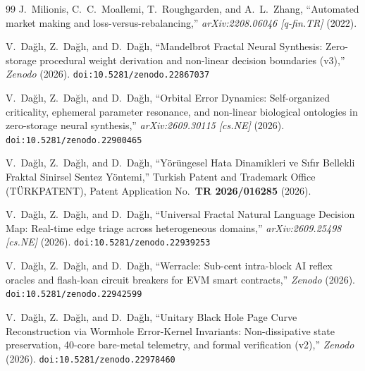 \documentclass[10pt,a4paper]{article}
\begin{document}
\begin{thebibliography}{99}
 J.~Milionis, C.~C.~Moallemi, T.~Roughgarden, and A.~L.~Zhang, ``Automated market making and loss-versus-rebalancing,'' \emph{arXiv:2208.06046 [q-fin.TR]} (2022).

 V.~Dağlı, Z.~Dağlı, and D.~Dağlı, ``Mandelbrot Fractal Neural Synthesis: Zero-storage procedural weight derivation and non-linear decision boundaries (v3),'' \emph{Zenodo} (2026). \texttt{doi:10.5281/zenodo.22867037}

 V.~Dağlı, Z.~Dağlı, and D.~Dağlı, ``Orbital Error Dynamics: Self-organized criticality, ephemeral parameter resonance, and non-linear biological ontologies in zero-storage neural synthesis,'' \emph{arXiv:2609.30115 [cs.NE]} (2026). \texttt{doi:10.5281/zenodo.22900465}

 V.~Dağlı, Z.~Dağlı, and D.~Dağlı, ``Y\"{o}r\"{u}ngesel Hata Dinamikleri ve S{\i}f{\i}r Bellekli Fraktal Sinirsel Sentez Y\"{o}ntemi,'' Turkish Patent and Trademark Office (T\"{U}RKPATENT), Patent Application No.\ \textbf{TR 2026/016285} (2026).

 V.~Dağlı, Z.~Dağlı, and D.~Dağlı, ``Universal Fractal Natural Language Decision Map: Real-time edge triage across heterogeneous domains,'' \emph{arXiv:2609.25498 [cs.NE]} (2026). \texttt{doi:10.5281/zenodo.22939253}

 V.~Dağlı, Z.~Dağlı, and D.~Dağlı, ``Werracle: Sub-cent intra-block AI reflex oracles and flash-loan circuit breakers for EVM smart contracts,'' \emph{Zenodo} (2026). \texttt{doi:10.5281/zenodo.22942599}

 V.~Dağlı, Z.~Dağlı, and D.~Dağlı, ``Unitary Black Hole Page Curve Reconstruction via Wormhole Error-Kernel Invariants: Non-dissipative state preservation, 40-core bare-metal telemetry, and formal verification (v2),'' \emph{Zenodo} (2026). \texttt{doi:10.5281/zenodo.22978460}

\end{thebibliography}
\end{document}

